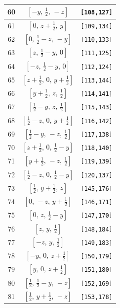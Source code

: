 \documentclass[fleqn,8pt]{jsarticle}
\begin{document}
\begin{longtable}{ccc}
60 & $\left[ - y,\, \frac{1}{2},\, - z \right]$ & {\tt [108,127]} \\ \hline
61 & $\left[ 0,\, z + \frac{1}{2},\, y \right]$ & {\tt [109,134]} \\ \hline
62 & $\left[ 0,\, \frac{1}{2} - z,\, - y \right]$ & {\tt [110,133]} \\ \hline
63 & $\left[ z,\, \frac{1}{2} - y,\, 0 \right]$ & {\tt [111,125]} \\ \hline
64 & $\left[ - z,\, \frac{1}{2} - y,\, 0 \right]$ & {\tt [112,124]} \\ \hline
65 & $\left[ z + \frac{1}{2},\, 0,\, y + \frac{1}{2} \right]$ & {\tt [113,144]} \\ \hline
66 & $\left[ y + \frac{1}{2},\, z,\, \frac{1}{2} \right]$ & {\tt [114,141]} \\ \hline
67 & $\left[ \frac{1}{2} - y,\, z,\, \frac{1}{2} \right]$ & {\tt [115,143]} \\ \hline
68 & $\left[ \frac{1}{2} - z,\, 0,\, y + \frac{1}{2} \right]$ & {\tt [116,142]} \\ \hline
69 & $\left[ \frac{1}{2} - y,\, - z,\, \frac{1}{2} \right]$ & {\tt [117,138]} \\ \hline
70 & $\left[ z + \frac{1}{2},\, 0,\, \frac{1}{2} - y \right]$ & {\tt [118,140]} \\ \hline
71 & $\left[ y + \frac{1}{2},\, - z,\, \frac{1}{2} \right]$ & {\tt [119,139]} \\ \hline
72 & $\left[ \frac{1}{2} - z,\, 0,\, \frac{1}{2} - y \right]$ & {\tt [120,137]} \\ \hline
73 & $\left[ \frac{1}{2},\, y + \frac{1}{2},\, z \right]$ & {\tt [145,176]} \\ \hline
74 & $\left[ 0,\, - z,\, y + \frac{1}{2} \right]$ & {\tt [146,171]} \\ \hline
75 & $\left[ 0,\, z,\, \frac{1}{2} - y \right]$ & {\tt [147,170]} \\ \hline
76 & $\left[ z,\, y,\, \frac{1}{2} \right]$ & {\tt [148,184]} \\ \hline
77 & $\left[ - z,\, y,\, \frac{1}{2} \right]$ & {\tt [149,183]} \\ \hline
78 & $\left[ - y,\, 0,\, z + \frac{1}{2} \right]$ & {\tt [150,179]} \\ \hline
79 & $\left[ y,\, 0,\, z + \frac{1}{2} \right]$ & {\tt [151,180]} \\ \hline
80 & $\left[ \frac{1}{2},\, \frac{1}{2} - y,\, - z \right]$ & {\tt [152,169]} \\ \hline
81 & $\left[ \frac{1}{2},\, y + \frac{1}{2},\, - z \right]$ & {\tt [153,178]} \\ \hline

\end{longtable}
\end{document}
